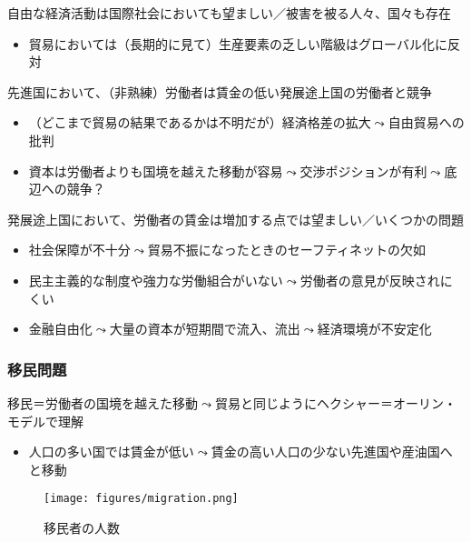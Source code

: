 \documentclass[
  xelatex,
  ja=standard]{bxjsarticle}
\providecommand{\tightlist}{%
  \setlength{\itemsep}{0pt}\setlength{\parskip}{0pt}}\usepackage{longtable,booktabs,array}
\begin{document}
自由な経済活動は国際社会においても望ましい／被害を被る人々、国々も存在

\begin{itemize}
\tightlist
\item
  貿易においては（長期的に見て）生産要素の乏しい階級はグローバル化に反対\citep{mussa1974}
\end{itemize}

先進国において、（非熟練）労働者は賃金の低い発展途上国の労働者と競争

\begin{itemize}
\tightlist
\item
  （どこまで貿易の結果であるかは不明だが）経済格差の拡大\(\leadsto\)自由貿易への批判\citep{flaherty2021}
\item
  資本は労働者よりも国境を越えた移動が容易\(\leadsto\)交渉ポジションが有利\(\leadsto\)底辺への競争？
\end{itemize}

発展途上国において、労働者の賃金は増加する点では望ましい／いくつかの問題

\begin{itemize}
\tightlist
\item
  社会保障が不十分\(\leadsto\)貿易不振になったときのセーフティネットの欠如
\item
  民主主義的な制度や強力な労働組合がいない\(\leadsto\)労働者の意見が反映されにくい
\item
  金融自由化\(\leadsto\)大量の資本が短期間で流入、流出\(\leadsto\)経済環境が不安定化
\end{itemize}

\hypertarget{ux79fbux6c11ux554fux984c}{%
\subsubsection{移民問題}\label{ux79fbux6c11ux554fux984c}}

移民＝労働者の国境を越えた移動\(\leadsto\)貿易と同じようにヘクシャー＝オーリン・モデルで理解

\begin{itemize}
\tightlist
\item
  人口の多い国では賃金が低い\(\leadsto\)賃金の高い人口の少ない先進国や産油国へと移動
\end{itemize}

\begin{figure}[htpb]

{\centering \texttt{[image: figures/migration.png]}

}

\caption{移民者の人数}

\end{figure}
\end{document}
